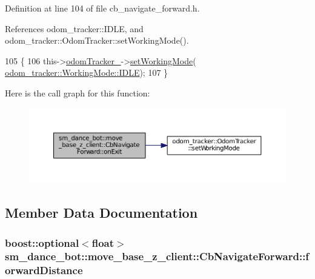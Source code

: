 Definition at line 104 of file cb\+\_\+navigate\+\_\+forward.\+h.



References odom\+\_\+tracker\+::\+I\+D\+LE, and odom\+\_\+tracker\+::\+Odom\+Tracker\+::set\+Working\+Mode().


\begin{DoxyCode}
105     \{
106         this->\hyperlink{classsm__dance__bot_1_1move__base__z__client_1_1CbNavigateForward_affc6ced1bd3ba8cb80461a1a60c65d04}{odomTracker\_}->\hyperlink{classodom__tracker_1_1OdomTracker_ac001a40d1107ef0d88aa7db03cafb08c}{setWorkingMode}(
      \hyperlink{namespaceodom__tracker_a4daf27fd157b1a481fdfd6f90de00b88aa5daf7f2ebbba4975d61dab1c40188c7}{odom\_tracker::WorkingMode::IDLE});
107     \}
\end{DoxyCode}


Here is the call graph for this function\+:
\nopagebreak
\begin{figure}[H]
\begin{center}
\leavevmode
\includegraphics[width=350pt]{classsm__dance__bot_1_1move__base__z__client_1_1CbNavigateForward_a90db9adad4099a59e5ae07f95aa1c8ac_cgraph}
\end{center}
\end{figure}




\subsection{Member Data Documentation}
\subsubsection[{\texorpdfstring{forward\+Distance}{forwardDistance}}]{\setlength{\rightskip}{0pt plus 5cm}boost\+::optional$<$float$>$ sm\+\_\+dance\+\_\+bot\+::move\+\_\+base\+\_\+z\+\_\+client\+::\+Cb\+Navigate\+Forward\+::forward\+Distance}\hypertarget{classsm__dance__bot_1_1move__base__z__client_1_1CbNavigateForward_a2c1a04f86c3a0c40d516654fa0b4944a}{}\label{classsm__dance__bot_1_1move__base__z__client_1_1CbNavigateForward_a2c1a04f86c3a0c40d516654fa0b4944a}


